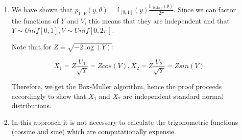 \documentclass[12pt,letterpaper]{article}
\begin{document}
\begin{enumerate}[leftmargin=!,labelindent=5pt]
	\item We have shown that $p_{Y,V}(y,\theta) =
	\mathbb{I}_{[0,1]}(y)\frac{\mathbb{I}_{[0,2\pi]}(\theta)}{2\pi}$.
	Since we can factor the functions of $Y$ and $V$, this means
	that they are independent and that
	$Y \sim Unif[0,1], V \sim Unif[0,2\pi]$.

	Note that for $Z = \sqrt{-2\log(Y)}$:

	$$ X_1 = Z\frac{U_1}{\sqrt Y} = Z cos(V) , X_2
	= Z\frac{U_2}{\sqrt Y} = Z sin(V)$$

	Therefore, we get the Box-Muller algorithm, hence the proof proceeds
	accordingly to show that $X_1$ and $X_2$ are independent standard
	normal distributions.


	\item In this approach it is not necessery to calculate the 
	trigonometric functions (cossine and sine) which are computationally
	expensie.

\end{enumerate}

\newpage
\end{document}
